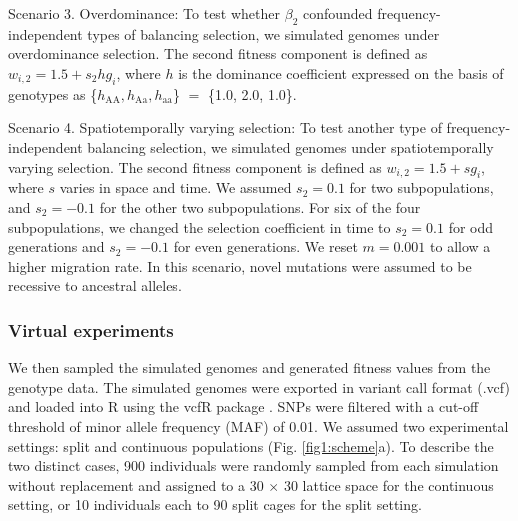 \documentclass[12pt,]{article}
\begin{document}
Scenario 3. Overdominance: To test whether $\beta_2$ confounded frequency-independent types of balancing selection, we simulated genomes under overdominance selection. The second fitness component is defined as $w_{i,2} = 1.5 + s_2hg_i$, where $h$ is the dominance coefficient expressed on the basis of genotypes as \{$h_\mathrm{AA}, h_\mathrm{Aa}, h_\mathrm{aa}$\} $=$ \{1.0, 2.0, 1.0\}.

Scenario 4. Spatiotemporally varying selection: To test another type of frequency-independent balancing selection, we simulated genomes under spatiotemporally varying selection. The second fitness component is defined as $w_{i,2} = 1.5 + s g_i$, where $s$ varies in space and time. We assumed $s_2=0.1$ for two subpopulations, and $s_2=-0.1$ for the other two subpopulations. For six of the four subpopulations, we changed the selection coefficient in time to $s_2=0.1$ for odd generations and $s_2=-0.1$ for even generations. We reset $m=0.001$ to allow a higher migration rate. In this scenario, novel mutations were assumed to be recessive to ancestral alleles.

\subsubsection{Virtual experiments}
We then sampled the simulated genomes and generated fitness values from the genotype data. The simulated genomes were exported in variant call format (.vcf) and loaded into R using the vcfR package \citep{knaus2017vcfr}. SNPs were filtered with a cut-off threshold of minor allele frequency (MAF) of 0.01. We assumed two experimental settings: split and continuous populations (Fig. \ref{fig1:scheme}a). To describe the two distinct cases, 900 individuals were randomly sampled from each simulation without replacement and assigned to a 30 $\times$ 30 lattice space for the continuous setting, or 10 individuals each to 90 split cages for the split setting.
\end{document}
